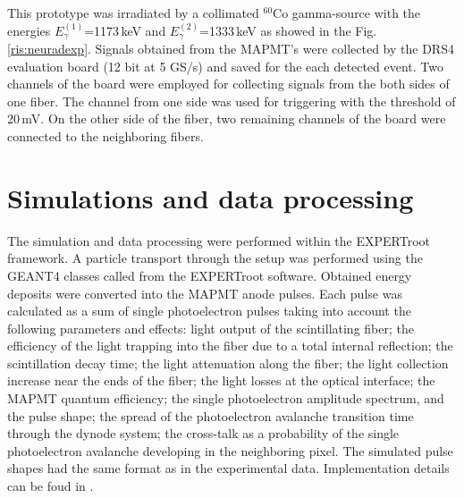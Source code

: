 \documentclass{webofc}
\newcommand{\er}{\textmd{EXPERTroot}}
\newcommand{\red}[1]{\textcolor{red}{#1}}
\begin{document}
This prototype was irradiated by a collimated $^{60}$Co gamma-source with the energies $E^{(1)}_{\gamma}$=1173\,keV and $E^{(2)}_{\gamma}$=1333\,keV as showed in the Fig.\,\ref{ris:neuradexp}. Signals obtained from the MAPMT's were collected by the DRS4 evaluation board \cite{DRS} (12 bit at 5 GS/s) and saved for the each detected event.
Two channels of the board were employed for collecting signals from the both sides of one fiber. 
The channel from one side was used for triggering with the threshold of 20\,mV.
On the other side of the fiber, two remaining channels of the board were connected to the neighboring fibers.

\section{Simulations and data processing}

The simulation and data processing were performed within the \er\, framework.
A particle transport through the setup was performed using the GEANT4 \cite{geant4} classes called from the EXPERTroot software. Obtained energy deposits were converted into the MAPMT anode pulses.
Each pulse was calculated as a sum of single photoelectron pulses taking into account the following parameters and effects: light output of the scintillating fiber; the efficiency of the light trapping into the fiber due to a total internal reflection; the scintillation decay time; the light attenuation along the fiber; the light collection increase near the ends of the fiber; the light losses at the optical interface; the MAPMT quantum efficiency; the single photoelectron amplitude spectrum, and the pulse shape; the spread of the photoelectron avalanche transition time through the dynode system; the cross-talk as a probability of the single photoelectron avalanche developing in the neighboring pixel.
The simulated pulse shapes had the same format as in the experimental data. Implementation details can be foud in \cite{neuradSim}. 
\end{document}
